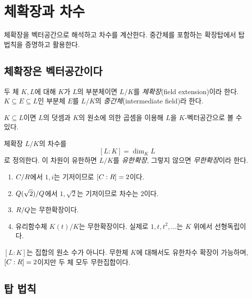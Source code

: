 \section{체확장과 차수}
\label{sec:field-degree}

\begin{learninggoal}
체확장을 벡터공간으로 해석하고 차수를 계산한다. 중간체를 포함하는 확장탑에서 탑 법칙을 증명하고 활용한다.
\end{learninggoal}

\subsection{체확장은 벡터공간이다}

\begin{definition}[체확장]
두 체 $K,L$에 대해 $K$가 $L$의 부분체이면 $L/K$를 \emph{체확장}(field extension)이라 한다. $K\subseteq E\subseteq L$인 부분체 $E$를 $L/K$의 \emph{중간체}(intermediate field)라 한다.
\end{definition}

$K\subseteq L$이면 $L$의 덧셈과 $K$의 원소에 의한 곱셈을 이용해 $L$을 $K$-벡터공간으로 볼 수 있다.

\begin{definition}[확장의 차수]
체확장 $L/K$의 차수를
\[
  [L:K]=\dim_K L
\]
로 정의한다. 이 차원이 유한하면 $L/K$를 \emph{유한확장}, 그렇지 않으면 \emph{무한확장}이라 한다.
\end{definition}

\begin{example}
\begin{enumerate}[label=(\alph*)]
  \item $C/R$에서 $1,i$는 기저이므로 $[C:R]=2$이다.
  \item $Q(\sqrt2)/Q$에서 $1,\sqrt2$는 기저이므로 차수는 $2$이다.
  \item $R/Q$는 무한확장이다.
  \item 유리함수체 $K(t)/K$는 무한확장이다. 실제로 $1,t,t^2,\dots$는 $K$ 위에서 선형독립이다.
\end{enumerate}
\end{example}

\begin{pitfall}
$[L:K]$는 집합의 원소 수가 아니다. 무한체 $K$에 대해서도 유한차수 확장이 가능하며, $[C:R]=2$이지만 두 체 모두 무한집합이다.
\end{pitfall}

\subsection{탑 법칙}

